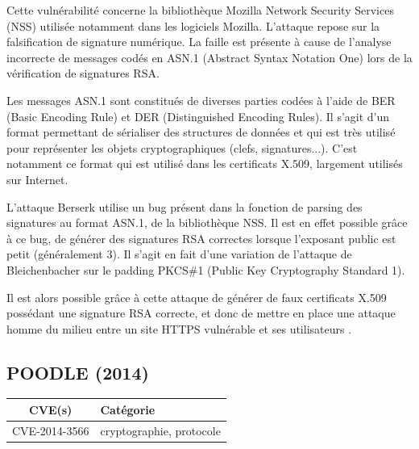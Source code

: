 \vspace{1em}

Cette vulnérabilité concerne la bibliothèque Mozilla Network Security Services (NSS) utilisée notamment dans les logiciels Mozilla. L'attaque repose sur la falsification de signature numérique. La faille est présente à cause de l'analyse incorrecte de messages codés en ASN.1 (Abstract Syntax Notation One) lors de la vérification de signatures RSA.

Les messages ASN.1 sont constitués de diverses parties codées à l'aide de BER (Basic Encoding Rule) et DER (Distinguished Encoding Rules). Il s'agit d'un format permettant de sérialiser des structures de données et qui est très utilisé pour représenter les objets cryptographiques (clefs, signatures...). C'est notamment ce format qui est utilisé dans les certificats X.509, largement utilisés sur Internet.

L'attaque Berserk utilise un bug présent dans la fonction de parsing des signatures au format ASN.1, de la bibliothèque NSS. Il est en effet possible grâce à ce bug, de générer des signatures RSA correctes lorsque l'exposant public est petit (généralement 3). Il s'agit en fait d'une variation de l'attaque de Bleichenbacher sur le padding PKCS\#1 (Public Key Cryptography Standard 1).

Il est alors possible grâce à cette attaque de générer de faux certificats X.509 possédant une signature RSA correcte, et donc de mettre en place une attaque homme du milieu entre un site HTTPS vulnérable et ses utilisateurs \cite{berserk}.




\subsection{POODLE (2014)}

\label{sec:poodle}

\begin{tabularx}{0.96\textwidth}{|c|X|}
  \hline
  \textbf{CVE(s)} & \textbf{Catégorie} \\
  \hline
  CVE-2014-3566 & cryptographie, protocole \\
  \hline
\end{tabularx}

\vspace{1em}

